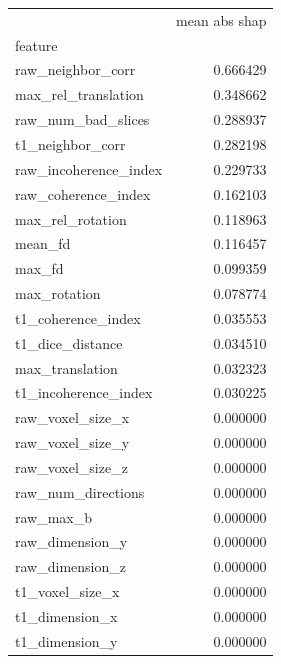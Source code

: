 \documentclass[fleqn,10pt,inline]{wlscirep}
\begin{document}
\begin{table}[tbp]
\begin{multicols}{2}
\centering
\begin{tabular}{lr}
\toprule
{} &  mean abs shap \\
feature               &                           \\
\midrule
raw\_neighbor\_corr     &                  0.666429 \\
max\_rel\_translation   &                  0.348662 \\
raw\_num\_bad\_slices    &                  0.288937 \\
t1\_neighbor\_corr      &                  0.282198 \\
raw\_incoherence\_index &                  0.229733 \\
raw\_coherence\_index   &                  0.162103 \\
max\_rel\_rotation      &                  0.118963 \\
mean\_fd               &                  0.116457 \\
max\_fd                &                  0.099359 \\
max\_rotation          &                  0.078774 \\
t1\_coherence\_index    &                  0.035553 \\
t1\_dice\_distance      &                  0.034510 \\
max\_translation       &                  0.032323 \\
t1\_incoherence\_index  &                  0.030225 \\
raw\_voxel\_size\_x      &                  0.000000 \\
raw\_voxel\_size\_y      &                  0.000000 \\
raw\_voxel\_size\_z      &                  0.000000 \\
raw\_num\_directions    &                  0.000000 \\
raw\_max\_b             &                  0.000000 \\
raw\_dimension\_y       &                  0.000000 \\
raw\_dimension\_z       &                  0.000000 \\
t1\_voxel\_size\_x       &                  0.000000 \\
t1\_dimension\_x        &                  0.000000 \\
t1\_dimension\_y        &                  0.000000 \\

\end{tabular}
\end{multicols}
\end{table}
\end{document}
